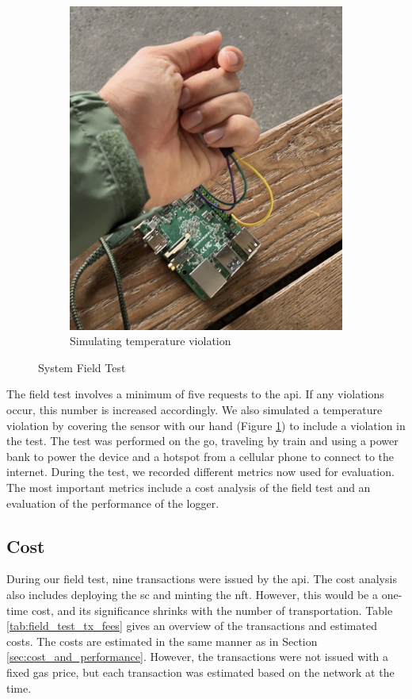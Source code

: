 \begin{figure}[ht]
\begin{subfigure}{0.5\textwidth}
        \includegraphics[height=0.25\textheight]{resources/cover_sensor.jpeg}
        \caption{Simulating temperature violation}
        \label{fig:covering_sensor}
    \end{subfigure}
    \caption{System Field Test}
    \label{fig:field_test}
\end{figure}

The field test involves a minimum of five requests to the \gls{api}. If any violations occur, this number is increased accordingly. We also simulated a temperature violation by covering the sensor with our hand (Figure \ref{fig:covering_sensor}) to include a violation in the test. The test was performed on the go, traveling by train and using a power bank to power the device and a hotspot from a cellular phone to connect to the internet. During the test, we recorded different metrics now used for evaluation. The most important metrics include a cost analysis of the field test and an evaluation of the performance of the logger.

\subsection{Cost}
During our field test, nine transactions were issued by the \gls{api}. The cost analysis also includes deploying the \gls{sc} and minting the \gls{nft}. However, this would be a one-time cost, and its significance shrinks with the number of transportation. Table \ref{tab:field_test_tx_fees} gives an overview of the transactions and estimated costs. The costs are estimated in the same manner as in Section \ref{sec:cost_and_performance}. However, the transactions were not issued with a fixed gas price, but each transaction was estimated based on the network at the time. 

